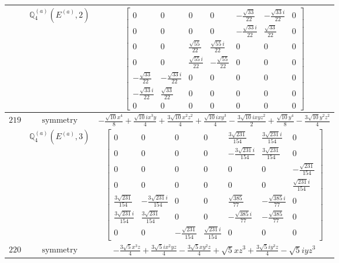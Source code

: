 \documentclass[fleqn,8pt,landscape]{jsarticle}
\begin{document}
\begin{longtable}{ccc}
$  $ & $ \mathbb{Q}_{4}^{(a)}(E^{(a)},2) $ & $ \begin{bmatrix} 0 & 0 & 0 & 0 & - \frac{\sqrt{33}}{22} & - \frac{\sqrt{33} i}{22} & 0 \\ 0 & 0 & 0 & 0 & - \frac{\sqrt{33} i}{22} & \frac{\sqrt{33}}{22} & 0 \\ 0 & 0 & \frac{\sqrt{55}}{22} & \frac{\sqrt{55} i}{22} & 0 & 0 & 0 \\ 0 & 0 & \frac{\sqrt{55} i}{22} & - \frac{\sqrt{55}}{22} & 0 & 0 & 0 \\ - \frac{\sqrt{33}}{22} & - \frac{\sqrt{33} i}{22} & 0 & 0 & 0 & 0 & 0 \\ - \frac{\sqrt{33} i}{22} & \frac{\sqrt{33}}{22} & 0 & 0 & 0 & 0 & 0 \\ 0 & 0 & 0 & 0 & 0 & 0 & 0 \end{bmatrix} $ \\ \hline
$ 219 $ & $ \text{symmetry} $ & $ - \frac{\sqrt{10} x^{4}}{8} + \frac{\sqrt{10} i x^{3} y}{4} + \frac{3 \sqrt{10} x^{2} z^{2}}{4} + \frac{\sqrt{10} i x y^{3}}{4} - \frac{3 \sqrt{10} i x y z^{2}}{2} + \frac{\sqrt{10} y^{4}}{8} - \frac{3 \sqrt{10} y^{2} z^{2}}{4} $ \\
$  $ & $ \mathbb{Q}_{4}^{(a)}(E^{(a)},3) $ & $ \begin{bmatrix} 0 & 0 & 0 & 0 & \frac{3 \sqrt{231}}{154} & \frac{3 \sqrt{231} i}{154} & 0 \\ 0 & 0 & 0 & 0 & - \frac{3 \sqrt{231} i}{154} & \frac{3 \sqrt{231}}{154} & 0 \\ 0 & 0 & 0 & 0 & 0 & 0 & - \frac{\sqrt{231}}{154} \\ 0 & 0 & 0 & 0 & 0 & 0 & \frac{\sqrt{231} i}{154} \\ \frac{3 \sqrt{231}}{154} & - \frac{3 \sqrt{231} i}{154} & 0 & 0 & \frac{\sqrt{385}}{77} & - \frac{\sqrt{385} i}{77} & 0 \\ \frac{3 \sqrt{231} i}{154} & \frac{3 \sqrt{231}}{154} & 0 & 0 & - \frac{\sqrt{385} i}{77} & - \frac{\sqrt{385}}{77} & 0 \\ 0 & 0 & - \frac{\sqrt{231}}{154} & \frac{\sqrt{231} i}{154} & 0 & 0 & 0 \end{bmatrix} $ \\ \hline
$ 220 $ & $ \text{symmetry} $ & $ - \frac{3 \sqrt{5} x^{3} z}{4} + \frac{3 \sqrt{5} i x^{2} y z}{4} - \frac{3 \sqrt{5} x y^{2} z}{4} + \sqrt{5} x z^{3} + \frac{3 \sqrt{5} i y^{3} z}{4} - \sqrt{5} i y z^{3} $ \\

\end{longtable}
\end{document}
